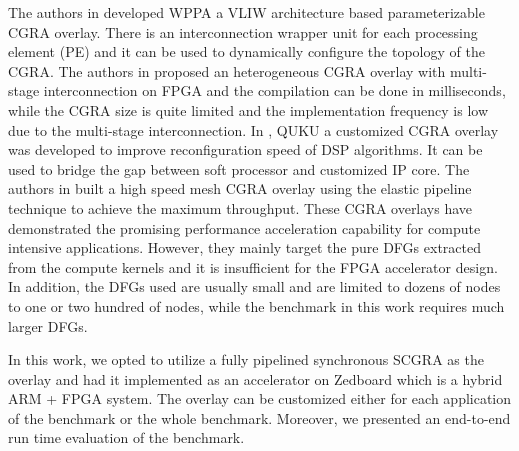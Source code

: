 The authors in \cite{kissler2006dynamically} developed WPPA a VLIW architecture based parameterizable CGRA overlay. There is an interconnection wrapper unit for each processing element (PE) and it can be used to dynamically configure the topology of the CGRA. The authors in \cite{ferreira2011fpga} proposed an heterogeneous CGRA overlay with multi-stage interconnection on FPGA and the compilation can be done in milliseconds, while the CGRA size is quite limited and the implementation frequency is low due to the multi-stage interconnection. In \cite{shukla2006quku}, QUKU a customized CGRA overlay was developed to improve reconfiguration speed of DSP algorithms. It can be used to bridge the gap between soft processor and customized IP core. The authors in \cite{capalijia2013pipelined} built a high speed mesh CGRA overlay using the elastic pipeline technique to achieve the maximum throughput. These CGRA overlays have demonstrated the promising performance acceleration capability for compute intensive applications. However, they mainly target the pure DFGs extracted from the compute kernels and it is insufficient for the FPGA accelerator design. In addition, the DFGs used are usually small and are limited to dozens of nodes to one or two hundred of nodes, while the benchmark in this work requires much larger DFGs.  

In this work, we opted to utilize a fully pipelined synchronous SCGRA as the overlay and had it implemented as an accelerator on Zedboard \cite{zedboard} which is a hybrid ARM + FPGA system. The overlay can be customized either for each application of the benchmark or the whole benchmark. Moreover, we presented an end-to-end run time evaluation of the benchmark. 

